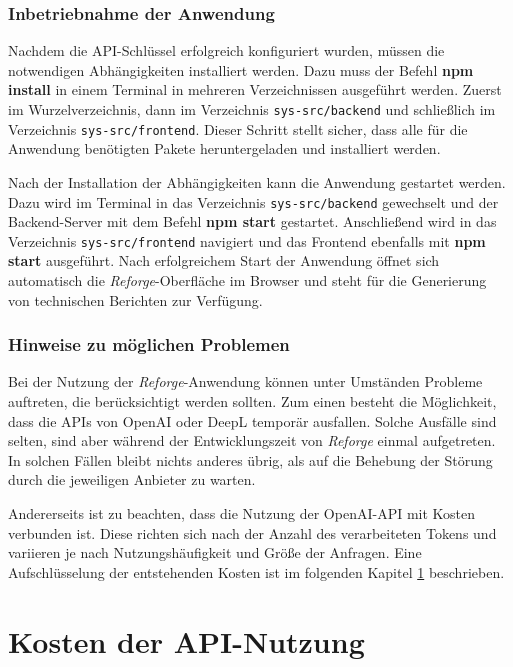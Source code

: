 \subsubsection{Inbetriebnahme der Anwendung}

Nachdem die \ac{API}-Schlüssel erfolgreich konfiguriert wurden, müssen die notwendigen Abhängigkeiten installiert werden. Dazu muss der Befehl \textbf{npm install} in einem Terminal in mehreren Verzeichnissen ausgeführt werden. Zuerst im Wurzelverzeichnis, dann im Verzeichnis \texttt{sys-src/backend} und schließlich im Verzeichnis \texttt{sys-src/frontend}. Dieser Schritt stellt sicher, dass alle für die Anwendung benötigten Pakete heruntergeladen und installiert werden.

Nach der Installation der Abhängigkeiten kann die Anwendung gestartet werden. Dazu wird im Terminal in das Verzeichnis \texttt{sys-src/backend} gewechselt und der Backend-Server mit dem Befehl \textbf{npm start} gestartet. Anschließend wird in das Verzeichnis \texttt{sys-src/frontend} navigiert und das Frontend ebenfalls mit \textbf{npm start} ausgeführt. Nach erfolgreichem Start der Anwendung öffnet sich automatisch die \textit{Reforge}-Oberfläche im Browser und steht für die Generierung von technischen Berichten zur Verfügung.

\subsubsection{Hinweise zu möglichen Problemen}

Bei der Nutzung der \textit{Reforge}-Anwendung können unter Umständen Probleme auftreten, die berücksichtigt werden sollten. Zum einen besteht die Möglichkeit, dass die \ac{API}s von OpenAI oder DeepL temporär ausfallen. Solche Ausfälle sind selten, sind aber während der Entwicklungszeit von \textit{Reforge} einmal aufgetreten. In solchen Fällen bleibt nichts anderes übrig, als auf die Behebung der Störung durch die jeweiligen Anbieter zu warten.

Andererseits ist zu beachten, dass die Nutzung der OpenAI-\ac{API} mit Kosten verbunden ist. Diese richten sich nach der Anzahl des verarbeiteten Tokens und variieren je nach Nutzungshäufigkeit und Größe der Anfragen. Eine Aufschlüsselung der entstehenden Kosten ist im folgenden Kapitel \ref{sec:apikosten} beschrieben.

\section{Kosten der API-Nutzung}
\label{sec:apikosten}

